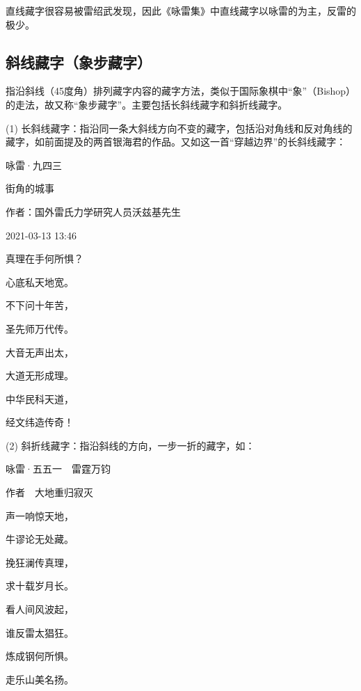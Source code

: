 \documentclass[UTF8,12pt,oneside]{ctexbook}
\begin{document}
        直线藏字很容易被雷绍武发现，因此《咏雷集》中直线藏字以咏雷的为主，反雷的极少。

        \subsection{斜线藏字（象步藏字）}

        指沿斜线（45度角）排列藏字内容的藏字方法，类似于国际象棋中“象”（Bishop）的走法，故又称“象步藏字”。主要包括长斜线藏字和斜折线藏字。

        (1) 长斜线藏字：指沿同一条大斜线方向不变的藏字，包括沿对角线和反对角线的藏字，如前面提及的两首银海君的作品。又如这一首“穿越边界”的长斜线藏字：

        \begin{center}
            \heiti 咏雷·九四三
            
            \songti 街角的城事
            
            作者：国外雷氏力学研究人员沃兹基先生
            
            2021-03-13 13:46

            \kaishu
            真理在手何所惧？
            
            心底私天地宽。
            
            不下问十年苦，
            
            圣先师万代传。
            
            大音无声出太，
            
            大道无形成理。
            
            中华民科天道，
            
            经文纬造传奇！

        \end{center}
        
        (2) 斜折线藏字：指沿斜线的方向，一步一折的藏字，如：

        \begin{center}
            \heiti 咏雷·五五一\ \ 雷霆万钧
            
            \songti 作者\ \ 大地重归寂灭

            \kaishu
            声一响惊天地，

            牛谬论无处藏。

            挽狂澜传真理，

            求十载岁月长。

            看人间风波起，

            谁反雷太猖狂。

            炼成钢何所惧。

            走乐山美名扬。

        \end{center}
\end{document}
